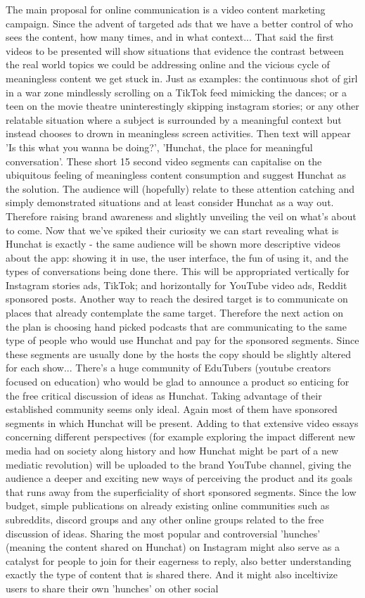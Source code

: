 \documentclass[12pt]{article}
\begin{document}
	The main proposal for online communication is a video content marketing campaign. Since the advent of targeted ads that we have a better control of who sees the content, how many times, and in what context... That said the first videos to be presented will show situations that evidence the contrast between the real world topics we could be addressing online and the vicious cycle of meaningless content we get stuck in. Just as examples: the continuous shot of girl in a war zone mindlessly scrolling on a TikTok feed mimicking the dances; or a teen on the movie theatre uninterestingly skipping instagram stories; or any other relatable situation where a subject is surrounded by a meaningful context but instead chooses to drown in meaningless screen activities. Then text will appear 'Is this what you wanna be doing?', 'Hunchat, the place for meaningful conversation'. These short 15 second video segments can capitalise on the ubiquitous feeling of meaningless content consumption and suggest Hunchat as the solution. The audience will (hopefully) relate to these attention catching and simply demonstrated situations and at least consider Hunchat as a way out. Therefore raising brand awareness and slightly unveiling the veil on what's about to come. Now that we've spiked their curiosity we can start revealing what is Hunchat is exactly - the same audience will be shown more descriptive videos about the app: showing it in use, the user interface, the fun of using it, and the types of conversations being done there. This will be appropriated vertically for Instagram stories ads, TikTok; and horizontally for YouTube video ads, Reddit sponsored posts. Another way to reach the desired target is to communicate on places that already contemplate the same target. Therefore the next action on the plan is choosing hand picked podcasts that are communicating to the same type of people who would use Hunchat and pay for the sponsored segments. Since these segments are usually done by the hosts the copy should be slightly altered for each show... There's a huge community of EduTubers (youtube creators focused on education) who would be glad to announce a product so enticing for the free critical discussion of ideas as Hunchat. Taking advantage of their established community seems only ideal. Again most of them have sponsored segments in which Hunchat will be present. Adding to that extensive video essays concerning different perspectives (for example exploring the impact different new media had on society along history and how Hunchat might be part of a new mediatic revolution) will be uploaded to the brand YouTube channel, giving the audience a deeper and exciting new ways of perceiving the product and its goals that runs away from the superficiality of short sponsored segments. Since the low budget, simple publications on already existing online communities such as subreddits, discord groups and any other online groups related to the free discussion of ideas. Sharing the most popular and controversial 'hunches' (meaning the content shared on Hunchat) on Instagram might also serve as a catalyst for people to join for their eagerness to reply, also better understanding exactly the type of content that is shared there. And it might also inceltivize users to share their own 'hunches' on other social 
\end{document}
